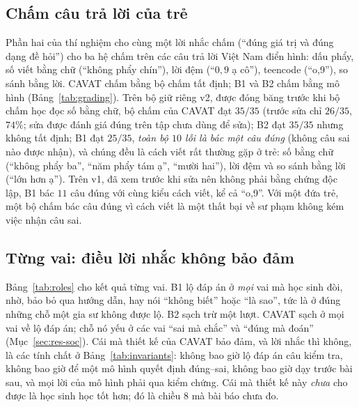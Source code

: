 \subsection{Chấm câu trả lời của trẻ}
Phần hai của thí nghiệm cho cùng một lời nhắc chấm (``đúng giá trị và đúng dạng đề hỏi'') cho ba hệ chấm trên các câu trả lời Việt Nam điển hình: dấu phẩy, số viết bằng chữ (``không phẩy chín''), lời đệm (``$0{,}9$ ạ cô''), teencode (``o,9''), so sánh bằng lời. CAVAT chấm bằng bộ chấm tất định; B1 và B2 chấm bằng mô hình (Bảng~\ref{tab:grading}). Trên bộ giữ riêng v2, được đóng băng trước khi bộ chấm học đọc số bằng chữ, bộ chấm của CAVAT đạt $35/35$ (trước sửa chỉ $26/35$, $74\%$; sửa được đánh giá đúng trên tập chưa dùng để sửa); B2 đạt $35/35$ nhưng không tất định; B1 đạt $25/35$, \emph{toàn bộ $10$ lỗi là bác một câu đúng} (không câu sai nào được nhận), và chúng đều là cách viết rất thường gặp ở trẻ: số bằng chữ (``không phẩy ba'', ``năm phẩy tám ạ'', ``mười hai''), lời đệm và so sánh bằng lời (``lớn hơn ạ''). Trên v1, đã xem trước khi sửa nên không phải bằng chứng độc lập, B1 bác $11$ câu đúng với cùng kiểu cách viết, kể cả ``o,9''. Với một đứa trẻ, một bộ chấm bác câu đúng vì cách viết là một thất bại về sư phạm không kém việc nhận câu sai.

\begin{table}[tp]
\centering
\caption{Chấm các câu trả lời của trẻ gán nhãn tay. v1 đã được xem trước khi sửa bộ chấm; v2 giữ riêng, đóng băng trước khi sửa. ``Sai dương'': nhận một câu sai; ``sai âm'': bác một câu đúng.}
\label{tab:grading}

\end{table}

\subsection{Từng vai: điều lời nhắc không bảo đảm}
Bảng~\ref{tab:roles} cho kết quả từng vai. B1 lộ đáp án ở \emph{mọi} vai mà học sinh đòi, nhờ, bảo bỏ qua hướng dẫn, hay nói ``không biết'' hoặc ``là sao'', tức là ở đúng những chỗ một gia sư không được lộ. B2 sạch trừ một lượt. CAVAT sạch ở mọi vai về lộ đáp án; chỗ nó yếu ở các vai ``sai mà chắc'' và ``đúng mà đoán'' (Mục~\ref{sec:res-soc}). Cái mà thiết kế của CAVAT bảo đảm, và lời nhắc thì không, là các tính chất ở Bảng~\ref{tab:invariants}: không bao giờ lộ đáp án câu kiểm tra, không bao giờ để một mô hình quyết định đúng--sai, không bao giờ dạy trước bài sau, và mọi lời của mô hình phải qua kiểm chứng. Cái mà thiết kế này \emph{chưa} cho được là học sinh học tốt hơn; đó là chiều 8 mà bài báo chưa đo.

\begin{table}[tp]
\centering
\caption{Kết quả từng vai: số lượt nói ra đáp án (luật) và điểm Socratic của giám khảo (trung bình các lượt).}
\label{tab:roles}

\end{table}
